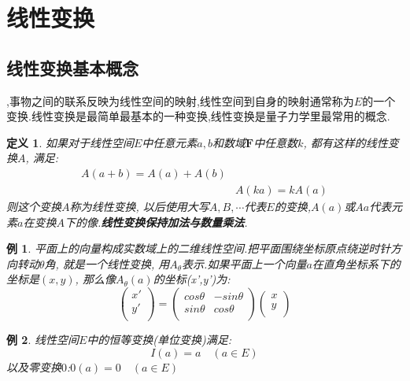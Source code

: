 \documentclass{book}
\newtheorem{definition}{\hspace{2em}定义}[section]
\newtheorem{example}{例}[section]
\begin{document}
\section{线性变换}
\subsection*{线性变换基本概念}
,事物之间的联系反映为线性空间的映射,线性空间到自身的映射通常称为$E$的一个变换.线性变换是最简单最基本的一种变换,线性变换是量子力学里最常用的概念.
\begin{definition}
  如果对于线性空间$E$中任意元素$a,b$和数域$\mathbf{F}$中任意数$k$, 都有这样的线性变换$A$, 满足:
  \begin{equation*}
  \begin{split}
     A(a+b)=A(a)+A(b)\\
     &A(ka)=kA(a)
  \end{split}
  \end{equation*}
  则这个变换$A$称为线性变换, 以后使用大写$A,B,\cdots$代表$E$的变换,$A(a)$或$Aa$代表元素$a$在变换$A$下的像.\textbf{线性变换保持加法与数量乘法}.
\end{definition}
\begin{example}
  平面上的向量构成实数域上的二维线性空间.把平面围绕坐标原点绕逆时针方向转动$\theta$角, 就是一个线性变换, 用$A_\theta$表示.如果平面上一个向量$a$在直角坐标系下的坐标是$(x,y)$, 那么像$A_\theta(a)$的坐标(x',y')为:
  \begin{equation*}
    \begin{pmatrix}
      x' \\
      y' \\
    \end{pmatrix}=\begin{pmatrix}
                    cos\theta & -sin\theta \\
                    sin\theta & cos\theta \\
                  \end{pmatrix}\begin{pmatrix}
                                 x \\
                                 y \\
                               \end{pmatrix}
  \end{equation*}
\end{example}
\begin{example}
  线性空间$E$中的恒等变换(单位变换)满足:
  \begin{equation*}
    I(a)=a\quad(a\in E)
  \end{equation*}
  以及零变换$0$:$0(a)=0\quad (a\in E)$
\end{example}
\end{document}
